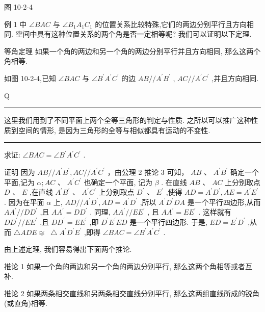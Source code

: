 \documentclass[10pt]{article}
\newcommand{\HRule}{\begin{center}\rule{0.9\linewidth}{0.2mm}\end{center}}
\begin{document}
图 10-2-4

例 1 中 \(\angle {BAC}\) 与 \(\angle {B}_{1}{A}_{1}{C}_{1}\) 的位置关系比较特殊,它们的两边分别平行且方向相同. 空间中具有这种位置关系的两个角是否一定相等呢? 我们可以证明以下定理.

等角定理 如果一个角的两边和另一个角的两边分别平行并且方向相同, 那么这两个角相等.

如图 10-2-4,已知 \(\angle {BAC}\) 与 \(\angle {B}^{\prime }{A}^{\prime }{C}^{\prime }\) 的边 \({AB}//{A}^{\prime }{B}^{\prime }\) , \({AC}//{A}^{\prime }{C}^{\prime }\) ,并且方向相同.

Q

\HRule

这里我们用到了不同平面上两个全等三角形的判定与性质. 之所以可以推广这种性质到空间的情形, 是因为三角形的全等与相似都具有运动的不变性.

\HRule

求证: \(\angle {BAC} = \angle {B}^{\prime }{A}^{\prime }{C}^{\prime }\) .

证明 因为 \({AB}//{{A}^{\prime }{B}^{\prime }},{AC}//{{A}^{\prime }{C}^{\prime }}\) ，由公理 2 推论 3 可知， \({AB}\text{ 、 }{A}^{\prime }{B}^{\prime }\) 确定一个平面,记为 \(\alpha ;{AC}\text{ 、 }{A}^{\prime }{C}^{\prime }\) 也确定一个平面, 记为 \(\beta\) . 在直线 \({AB}\text{ 、 }{AC}\) 上分别取点 \(D\text{ 、 }E\) ,在直线 \({A}^{\prime }{B}^{\prime }\) 、 \({A}^{\prime }{C}^{\prime }\) 上分别取点 \({D}^{\prime }\text{ 、 }{E}^{\prime }\) ,使得 \({AD} = {A}^{\prime }{D}^{\prime },{AE} = {A}^{\prime }{E}^{\prime }\) . 因为在平面 \(\alpha\) 上, \({AD}//{A}^{\prime }{D}^{\prime },{AD} = {A}^{\prime }{D}^{\prime }\) ,所以 \({A}^{\prime }{D}^{\prime }{DA}\) 是一个平行四边形,从而 \(A{A}^{\prime }//D{D}^{\prime }\) ,且 \(A{A}^{\prime } = D{D}^{\prime }\) . 同理, \(A{A}^{\prime }//E{E}^{\prime }\) , 且 \(A{A}^{\prime } = E{E}^{\prime }\) . 这样就有 \(D{D}^{\prime }//E{E}^{\prime }\) ,且 \(D{D}^{\prime } = E{E}^{\prime }\) ,即 \({D}^{\prime }{E}^{\prime }{ED}\) 是一个平行四边形. 于是, \({ED} = {E}^{\prime }{D}^{\prime }\) ,从而 \(\bigtriangleup {ADE}\underline{ \cong  } \; \bigtriangleup {A}^{\prime }{D}^{\prime }{E}^{\prime }\) ,即得 \(\angle {BAC} = \angle {B}^{\prime }{A}^{\prime }{C}^{\prime }\) .

由上述定理, 我们容易得出下面两个推论.

推论 1 如果一个角的两边和另一个角的两边分别平行, 那么这两个角相等或者互补.

推论 2 如果两条相交直线和另两条相交直线分别平行, 那么这两组直线所成的锐角 (或直角)相等.
\end{document}
